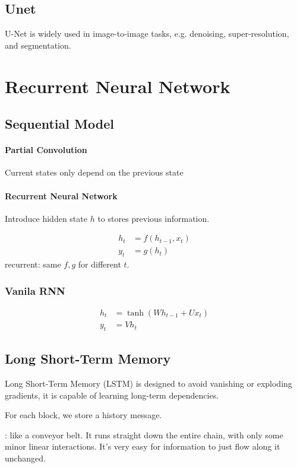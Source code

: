 \subsection{Unet}
U-Net is widely used in image-to-image tasks, e.g. denoising, super-resolution, and segmentation.

\section{Recurrent Neural Network}
\subsection{Sequential Model}

\paragraph{Partial Convolution} Current states only depend on the previous state

\paragraph{Recurrent Neural Network} Introduce hidden state  $ h  $ to stores previous information.

\begin{align*}
    h_t&=f(h_{t-1},x_t)\\
    y_t&=g(h_t)
\end{align*}
recurrent: same  $ f, g  $ for different  $ t $.


\subsubsection{Vanila RNN}
\begin{align*}
    h_t&=\tanh(Wh_{t-1}+Ux_t)\\
    y_t&=Vh_t
\end{align*}

\subsection{Long Short-Term Memory}
Long Short-Term Memory (LSTM) is designed to avoid vanishing or exploding gradients, it is capable of learning long-term dependencies.

For each block, we store a history message.

: like a conveyor belt. It runs straight down the entire chain, with only some minor linear interactions. It's very easy for information to just flow along it unchanged.


